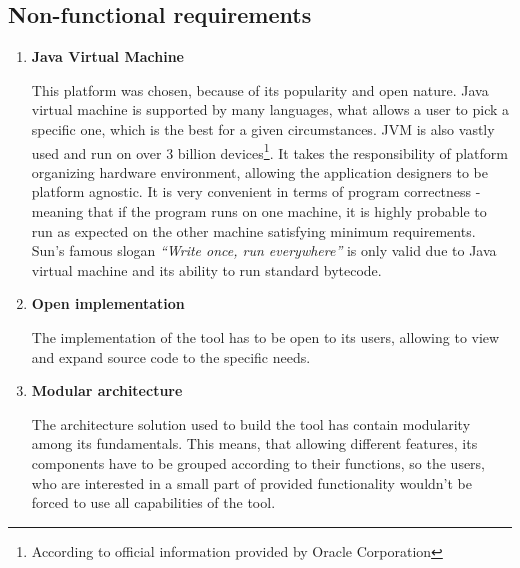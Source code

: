 \subsection{Non-functional requirements}
\begin{enumerate}
\item \textbf{Java Virtual Machine}

This platform was chosen, because of its popularity and open nature. Java virtual machine is supported by many languages, what allows a user to pick a specific one, which is the best for a given circumstances. JVM is also vastly used and run on over 3 billion devices\footnote{According to official information provided by Oracle Corporation}. It takes the responsibility of platform organizing hardware environment, allowing the application designers to be platform agnostic. It is very convenient in terms of program correctness - meaning that if the program runs on one machine, it is highly probable to run as expected on the other machine satisfying minimum requirements. Sun's famous slogan \textit{``Write once, run everywhere''} is only valid due to Java virtual machine and its ability to run standard bytecode.
\medbreak

\item \textbf{Open implementation}

The implementation of the tool has to be open to its users, allowing to view and expand source code to the specific needs. 
\medbreak

\item \label{nfreq:modul}\textbf{Modular architecture}

The architecture solution used to build the tool has contain modularity among its fundamentals. This means, that allowing different features, its components have to be grouped according to their functions, so the users, who are interested in a small part of provided functionality wouldn't be forced to use all capabilities of the tool.

\end{enumerate}

